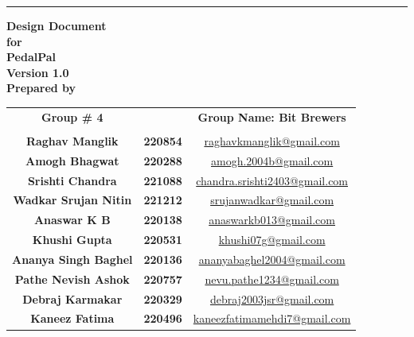 \documentclass[11pt]{article}
\begin{document}
\begin{titlingpage}
\begin{flushright}
    \rule{16cm}{5pt}\vskip1cm
    \textbf{{\fontsize{30}{36}\selectfont Design Document}\\\vspace{1cm}\huge{for}\\\vspace{1cm}\Huge{PedalPal}\\ \vspace{1.5cm}\LARGE{Version 1.0}\\\vspace{1cm}\LARGE{Prepared by}}
\end{flushright}
\vspace{1.0cm}
\large{\begin{tabular*}{\columnwidth}{@{\extracolsep{\stretch{1}}}*{3}{c}@{}}
    \Large{\textbf{Group \# 4}} & & \Large{\textbf{Group Name: Bit Brewers}} \\
    \\
    \textbf{Raghav Manglik} & \textbf{220854} & \href{mailto:raghavkmanglik@gmail.com}{raghavkmanglik@gmail.com} \\
    \textbf{Amogh Bhagwat} & \textbf{220288} & \href{mailto:amogh.2004b@gmail.com}{amogh.2004b@gmail.com} \\
    \textbf{Srishti Chandra} & \textbf{221088} & \href{mailto:chandra.srishti2403@gmail.com}{chandra.srishti2403@gmail.com} \\
    \textbf{Wadkar Srujan Nitin} & \textbf{221212} & \href{mailto:srujanwadkar@gmail.com}{srujanwadkar@gmail.com} \\
    \textbf{Anaswar K B} & \textbf{220138} & \href{mailto:anaswarkb013@gmail.com}{anaswarkb013@gmail.com} \\
    \textbf{Khushi Gupta} & \textbf{220531} & \href{mailto:khushi07g@gmail.com}{khushi07g@gmail.com} \\
    \textbf{Ananya Singh Baghel} & \textbf{220136} & \href{mailto:ananyabaghel2004@gmail.com}{ananyabaghel2004@gmail.com} \\
    \textbf{Pathe Nevish Ashok} & \textbf{220757} & \href{mailto:nevu.pathe1234@gmail.com}{nevu.pathe1234@gmail.com} \\
    \textbf{Debraj Karmakar} & \textbf{220329} & \href{mailto:debraj2003jsr@gmail.com}{debraj2003jsr@gmail.com} \\
    \textbf{Kaneez Fatima} & \textbf{220496} & \href{mailto:kaneezfatimamehdi7@gmail.com}{kaneezfatimamehdi7@gmail.com} \\
    

\end{tabular*}}
\end{titlingpage}
\end{document}
